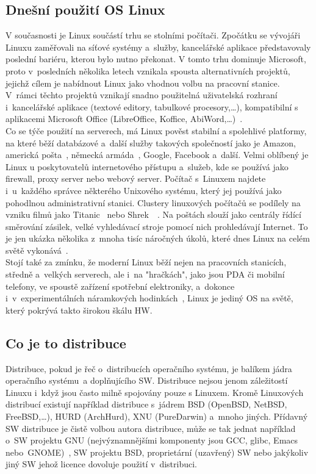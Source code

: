 \documentclass[a4paper,12pt]{article}
\begin{document}
\subsection{Dnešní použití OS Linux}
V současnosti je Linux součástí trhu se stolními počítači. Zpočátku se vývojáři Linuxu zaměřovali na síťové systémy a~služby, kancelářské aplikace představovaly poslední bariéru, kterou bylo nutno překonat. V tomto trhu dominuje Microsoft, proto v~posledních několika letech vznikala spousta alternativních projektů, jejichž cílem je nabídnout Linux jako vhodnou volbu na pracovní stanice. V~rámci těchto projektů vznikají snadno použitelná uživatelská rozhraní i~kancelářské aplikace (textové editory, tabulkové procesory,…), kompatibilní s aplikacemi Microsoft Office (LibreOffice, Koffice, AbiWord,…)~\cite{LDP}.\\
Co se týče použití na serverech, má Linux pověst stabilní a spolehlivé platformy, na které běží databázové a~další služby takových společností jako je Amazon, americká pošta~\cite{AmericanPostLinux}, německá armáda~\cite{GermanArmyNoLinux}, Google, Facebook a~další. Velmi oblíbený je Linux u poskytovatelů internetového přístupu a~služeb, kde se používá jako firewall, proxy server nebo webový server. Počítač s~Linuxem najdete i~u~každého správce některého Unixového systému, který jej používá jako pohodlnou administrativní stanici. Clustery linuxových počítačů se podílely na vzniku filmů jako Titanic~\cite{TitanicLinux} nebo Shrek~\cite{Shrek2Linux}~\cite{Shrek3Linux}. Na poštách slouží jako centrály řídící směrování zásilek, velké vyhledávací stroje pomocí nich prohledávají Internet. To je jen ukázka několika z~mnoha tisíc náročných úkolů, které dnes Linux na celém světě vykonává~\cite{LDP}.\\
Stojí také za zmínku, že moderní Linux běží nejen na pracovních stanicích, středně a~velkých serverech, ale i~na "hračkách", jako jsou PDA či mobilní telefony, ve spoustě zařízení spotřební elektroniky, a~dokonce i~v~experimentálních náramkových hodinkách~\cite{LinuxHodinky}, Linux je jediný OS na světě, který pokrývá takto širokou škálu HW.~\cite{LDP}

\subsection{Co je to distribuce}
Distribuce, pokud je řeč o~distribucích operačního systému, je balíkem jádra operačního systému~a doplňujícího SW. Distribuce nejsou jenom záležitostí Linuxu i~když jsou často milně spojovány pouze s Linuxem. Kromě Linuxových distribucí existují například distribuce s~jádrem BSD (OpenBSD, NetBSD, FreeBSD,…), HURD (ArchHurd), XNU (PureDarwin) a~mnoho jiných. Přídavný SW distribuce je čistě volbou autora distribuce, může se tak jednat například o~SW projektu GNU (nejvýznamnějšími komponenty jsou GCC, glibc, Emacs nebo~GNOME)~\cite{GNUweb}, SW projektu BSD, proprietární (uzavřený) SW nebo jakýkoliv jiný SW jehož licence dovoluje použití v~distribuci.
\end{document}
